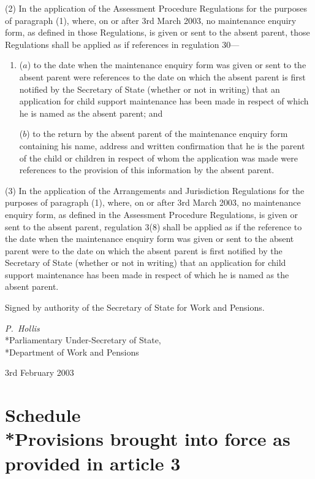 \documentclass[12pt,a4paper]{article}
\begin{document}
(2) In the application of the Assessment Procedure Regulations for the purposes of paragraph (1), where, on or after 3rd March 2003, no maintenance enquiry form, as defined in those Regulations, is given or sent to the absent parent, those Regulations shall be applied as if references in regulation 30—
\begin{enumerate}\item[]
($a$) to the date when the maintenance enquiry form was given or sent to the absent parent were references to the date on which the absent parent is first notified by the Secretary of State (whether or not in writing) that an application for child support maintenance has been made in respect of which he is named as the absent parent; and

($b$) to the return by the absent parent of the maintenance enquiry form containing his name, address and written confirmation that he is the parent of the child or children in respect of whom the application was made were references to the provision of this information by the absent parent.
\end{enumerate}

(3) In the application of the Arrangements and Jurisdiction Regulations for the purposes of paragraph (1), where, on or after 3rd March 2003, no maintenance enquiry form, as defined in the Assessment Procedure Regulations, is given or sent to the absent parent, regulation 3(8) shall be applied as if the reference to the date when the maintenance enquiry form was given or sent to the absent parent were to the date on which the absent parent is first notified by the Secretary of State (whether or not in writing) that an application for child support maintenance has been made in respect of which he is named as the absent parent. 

\bigskip

Signed 
by authority of the Secretary of State for Work and Pensions.

{\raggedleft
\emph{P.~Hollis}\\*Parliamentary Under-Secretary of State,\\*Department of Work and Pensions

}


3rd February 2003

\small

\part[Schedule --- Provisions brought into force as provided in article 3]{Schedule\\*Provisions brought into force as provided in article 3}
\end{document}
